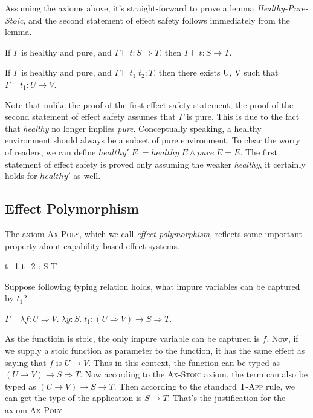 Assuming the axioms above, it's straight-forward to prove a lemma
\emph{Healthy-Pure-Stoic}, and the second statement of effect safety
follows immediately from the lemma.

\begin{lemma}
  If $\Gamma$ is healthy and pure,  and $\Gamma \vdash t : S
  \Rightarrow T$, then $\Gamma \vdash t : S \to T$.
\end{lemma}

\begin{theorem}
  If $\Gamma$ is healthy and pure, and $\Gamma \vdash t_1 \; t_2 :
  T$, then there exists U, V such that $\Gamma \vdash t_1 : U \to V$.
\end{theorem}

Note that unlike the proof of the first effect safety statement, the
proof of the second statement of effect safety assumes that $\Gamma$
is pure. This is due to the fact that \emph{healthy} no longer implies
\emph{pure}. Conceptually speaking, a healthy environment should
always be a subset of pure environment. To clear the worry of readers,
we can define $healthy' \; E := healthy \; E \wedge pure \; E = E$.
The first statement of effect safety is proved only assuming the
weaker \emph{healthy}, it certainly holds for $healthy'$ as well.

\subsection{Effect Polymorphism}

The axiom \textsc{Ax-Poly}, which we call \emph{effect polymorphism},
reflects some important property about capability-based effect
systems.

 { \Gamma \vdash t_1 \;
  t_2 : S \to T }


Suppose following typing relation holds, what impure
variables can be captured by $t_1$?

\begin{center}
  $\Gamma \vdash \lambda f:U \Rightarrow V. \; \lambda y:S. \; t_1 : (U
  \Rightarrow V) \to S \Rightarrow T$.
\end{center}

As the functioin is stoic, the only impure variable can be captured is
$f$. Now, if we supply a stoic function as parameter to the function,
it has the same effect as saying that $f$ is $U \to V$. Thus in this
context, the function can be typed as $(U \to V) \to S \Rightarrow T$.
Now according to the \textsc{Ax-Stoic} axiom, the term can also be
typed as $(U \to V) \to S \to T$. Then according to the standard
\textsc{T-App} rule, we can get the type of the application is
$S \to T$. That's the justification for the axiom \textsc{Ax-Poly}.

